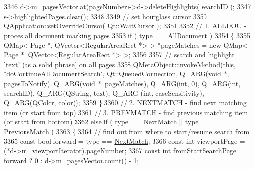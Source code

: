 \begin{DoxyCode}
{3346         d->\hyperlink{classOkular_1_1DocumentPrivate_a73b852d9a73ffe8061b66dbf9b290f17}{m\_pagesVector}.at(pageNumber)->d->deleteHighlights( searchID );
3347     s->\hyperlink{structRunningSearch_a5827c4228354199d0a4447dca7f19fb1}{highlightedPages}.clear();
3348 
3349     \textcolor{comment}{// set hourglass cursor}
3350     QApplication::setOverrideCursor( Qt::WaitCursor );
3351 
3352     \textcolor{comment}{// 1. ALLDOC - proces all document marking pages}
3353     \textcolor{keywordflow}{if} ( type == \hyperlink{classOkular_1_1Document_af4b4b32563d6013d6da10be1667a7bada3b5d0384aa5f19eb1336ffbecfd20131}{AllDocument} )
3354     \{
3355         \hyperlink{classQMap}{QMap< Page *, QVector<RegularAreaRect *>} > *pageMatches = \textcolor{keyword}{
      new} \hyperlink{classQMap}{QMap< Page *, QVector<RegularAreaRect *>} >;
3356 
3357         \textcolor{comment}{// search and highlight 'text' (as a solid phrase) on all pages}
3358         QMetaObject::invokeMethod(\textcolor{keyword}{this}, \textcolor{stringliteral}{"doContinueAllDocumentSearch"}, Qt::QueuedConnection, Q\_ARG(\textcolor{keywordtype}{void} *, 
      pagesToNotify), Q\_ARG(\textcolor{keywordtype}{void} *, pageMatches), Q\_ARG(\textcolor{keywordtype}{int}, 0), Q\_ARG(\textcolor{keywordtype}{int}, searchID), Q\_ARG(QString, text), Q\_ARG
      (\textcolor{keywordtype}{int}, caseSensitivity), Q\_ARG(QColor, color));
3359     \}
3360     \textcolor{comment}{// 2. NEXTMATCH - find next matching item (or start from top)}
3361     \textcolor{comment}{// 3. PREVMATCH - find previous matching item (or start from bottom)}
3362     \textcolor{keywordflow}{else} \textcolor{keywordflow}{if} ( type == \hyperlink{classOkular_1_1Document_af4b4b32563d6013d6da10be1667a7badab071628bda8b6bfb432ceae4eaca8792}{NextMatch} || type == \hyperlink{classOkular_1_1Document_af4b4b32563d6013d6da10be1667a7bada092b092af6301535f9e11921195c1e14}{PreviousMatch} )
3363     \{
3364         \textcolor{comment}{// find out from where to start/resume search from}
3365         \textcolor{keyword}{const} \textcolor{keywordtype}{bool} forward = type == \hyperlink{classOkular_1_1Document_af4b4b32563d6013d6da10be1667a7badab071628bda8b6bfb432ceae4eaca8792}{NextMatch};
3366         \textcolor{keyword}{const} \textcolor{keywordtype}{int} viewportPage = (*d->\hyperlink{classOkular_1_1DocumentPrivate_a81a62e8d31d0e7873cd5f5c1590fa2fc}{m\_viewportIterator}).pageNumber;
3367         \textcolor{keyword}{const} \textcolor{keywordtype}{int} fromStartSearchPage = forward ? 0 : d->\hyperlink{classOkular_1_1DocumentPrivate_a73b852d9a73ffe8061b66dbf9b290f17}{m\_pagesVector}.count() - 1;
}
\end{DoxyCode}
